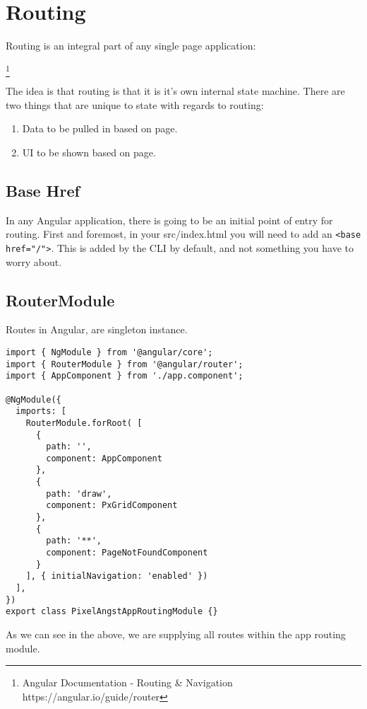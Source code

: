 \chapter{ Routing }


Routing is an integral part of any single page application:
\begin{displayquote}
 \footnote{Angular Documentation - Routing \& Navigation https://angular.io/guide/router}
\end{displayquote}
The idea is that routing is that it is it's own internal state machine. There
are two things that are unique to state with regards to routing:
\begin{enumerate}
  \item Data to be pulled in based on page.
  \item UI to be shown based on page.
\end{enumerate}

\section{Base Href}
In any Angular application, there is going to be an initial point of entry for
routing. First and foremost, in your src/index.html you will need to add an
\lstinline{<base href="/">}. This is added by the CLI by default, and not
something you have to worry about.

\section{ RouterModule }
Routes in Angular, are singleton instance.

\begin{lstlisting}[caption=app.module.ts file]
import { NgModule } from '@angular/core';
import { RouterModule } from '@angular/router';
import { AppComponent } from './app.component';

@NgModule({
  imports: [
    RouterModule.forRoot( [
      {
        path: '',
        component: AppComponent
      },
      {
        path: 'draw',
        component: PxGridComponent
      },
      {
        path: '**',
        component: PageNotFoundComponent
      }
    ], { initialNavigation: 'enabled' })
  ],
})
export class PixelAngstAppRoutingModule {}
\end{lstlisting}

As we can see in the above, we are supplying all routes within the app routing
module.

